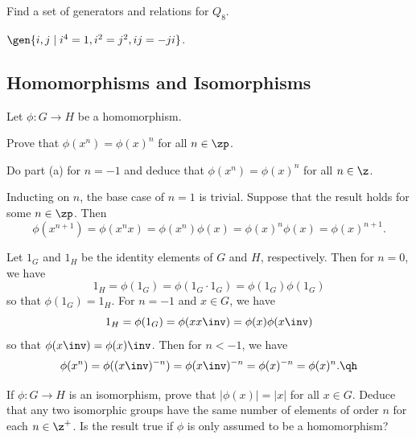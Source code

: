 \begin{exercise} \label{ex1.5.3}
    Find a set of generators and relations for $Q_8$.
\end{exercise}

\begin{sol}
    $\gen{i, j \mid i^4 = 1, i^2 = j^2, ij = -ji}$.
\end{sol}

\newpage

\subsection{Homomorphisms and Isomorphisms}

\begin{exercise}\label{ex1.6.1}
    Let $\phi : G \to H$ be a homomorphism.
    \begin{subproblems}
        \item Prove that $\phi(x^n) = \phi(x)^n$ for all $n \in \zp$.
        \item Do part (a) for $n = - 1$ and deduce that $\phi(x^n) = \phi(x)^n$ for all $n \in \z$.
    \end{subproblems}
\end{exercise}

\begin{solalph}
    \item Inducting on $n$, the base case of $n = 1$ is trivial. Suppose that the result holds for some $n \in \zp$. Then
    \[\phi(x^{n + 1}) = \phi(x^nx) = \phi(x^n)\phi(x) = \phi(x)^n\phi(x) = \phi(x)^{n + 1}.\]
    \item Let $1_G$ and $1_H$ be the identity elements of $G$ and $H$, respectively. Then for $n = 0$, we have
    \[1_H = \phi(1_G) = \phi(1_G \cdot 1_G) = \phi(1_G)\phi(1_G)\]
    so that $\phi(1_G) = 1_H$. For $n = -1$ and $x \in G$, we have
    \[1_H = \phi(1_G) = \phi(xx\inv) = \phi(x)\phi(x\inv)\]
    so that $\phi(x\inv) = \phi(x)\inv$. Then for $n < -1$, we have
    \[\phi(x^n) = \phi((x\inv)^{-n}) = \phi(x\inv)^{-n} = \phi(x)^{-n} = \phi(x)^n. \qh\]
\end{solalph}

\begin{specialexercise} \label{ex1.6.2}
    If $\phi : G \to H$ is an isomorphism, prove that $|\phi(x)| = |x|$ for all $x \in G$. Deduce that any two isomorphic groups have the same number of elements of order $n$ for each $n \in \z^+$. Is the result true if $\phi$ is only assumed to be a homomorphism?
\end{specialexercise}

